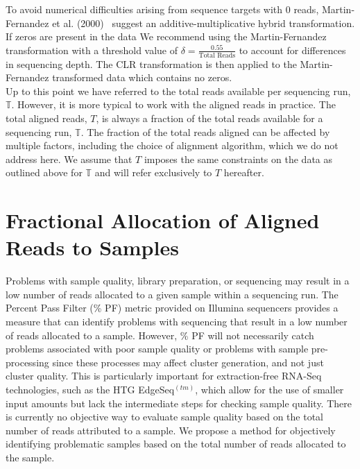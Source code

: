 \documentclass{article}\usepackage[]{graphicx}\usepackage[]{color}
\theoremstyle{definition}
\begin{document}
To avoid numerical difficulties arising from sequence targets with 0 reads, Martin-Fernandez et al. (2000)~\cite{Martin-Fernandez2000} suggest an additive-multiplicative hybrid transformation.  If zeros are present in the data We recommend using the Martin-Fernandez transformation with a threshold value of $\delta = \frac{0.55}{\text{Total Reads}}$ to account for differences in sequencing depth.  The CLR transformation is then applied to the Martin-Fernandez transformed data which contains no zeros. \\




Up to this point we have referred to the total reads available per sequencing run, $\mathbb{T}$.  However, it is more typical to work with the aligned reads in practice.  The total aligned reads, $T$, is always a fraction of the total reads available for a sequencing run, $\mathbb{T}$.  The fraction of the total reads aligned can be affected by multiple factors, including the choice of alignment algorithm, which we do not address here.  We assume that $T$ imposes the same constraints on the data as outlined above for $\mathbb{T}$ and will refer exclusively to $T$ hereafter.\\  


\section{Fractional Allocation of Aligned Reads to Samples}

Problems with sample quality, library preparation, or sequencing may result in a low number of reads allocated to a given sample within a sequencing run.  The Percent Pass Filter (\% PF) metric provided on Illumina sequencers provides a measure that can identify problems with sequencing that result in a low number of reads allocated to a sample.  However, \% PF will not necessarily catch problems associated with poor sample quality or problems with sample pre-processing since these processes may affect cluster generation, and not just cluster quality.  This is particularly important for extraction-free RNA-Seq technologies, such as the HTG EdgeSeq$^{(tm)}$, which allow for the use of smaller input amounts but lack the intermediate steps for checking sample quality.  There is currently no objective way to evaluate sample quality based on the total number of reads attributed to a sample. We propose a method for objectively identifying problematic samples based on the total number of reads allocated to the sample. \\
\end{document}
